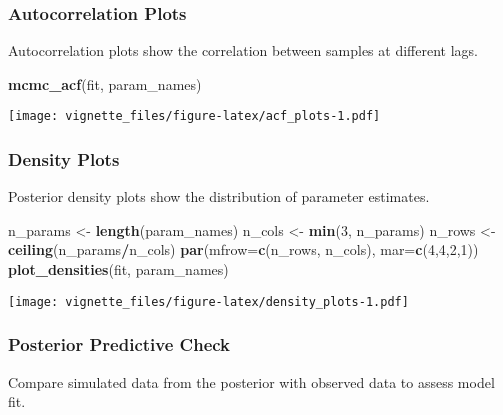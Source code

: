 \documentclass[
]{article}
\newenvironment{Shaded}{\begin{snugshade}}{\end{snugshade}}
\newcommand{\AttributeTok}[1]{\textcolor[rgb]{0.13,0.29,0.53}{#1}}
\newcommand{\DecValTok}[1]{\textcolor[rgb]{0.00,0.00,0.81}{#1}}
\newcommand{\FunctionTok}[1]{\textcolor[rgb]{0.13,0.29,0.53}{\textbf{#1}}}
\newcommand{\NormalTok}[1]{#1}
\newcommand{\OtherTok}[1]{\textcolor[rgb]{0.56,0.35,0.01}{#1}}
\newcommand{\SpecialCharTok}[1]{\textcolor[rgb]{0.81,0.36,0.00}{\textbf{#1}}}
\begin{document}
\subsubsection{Autocorrelation Plots}\label{autocorrelation-plots}

Autocorrelation plots show the correlation between samples at different
lags.

\begin{Shaded}
\begin{Highlighting}[]
\FunctionTok{mcmc\_acf}\NormalTok{(fit, param\_names)}
\end{Highlighting}
\end{Shaded}

\texttt{[image: vignette\_files/figure-latex/acf\_plots-1.pdf]}

\subsubsection{Density Plots}\label{density-plots}

Posterior density plots show the distribution of parameter estimates.

\begin{Shaded}
\begin{Highlighting}[]
\NormalTok{n\_params }\OtherTok{\textless{}{-}} \FunctionTok{length}\NormalTok{(param\_names)}
\NormalTok{n\_cols }\OtherTok{\textless{}{-}} \FunctionTok{min}\NormalTok{(}\DecValTok{3}\NormalTok{, n\_params)}
\NormalTok{n\_rows }\OtherTok{\textless{}{-}} \FunctionTok{ceiling}\NormalTok{(n\_params}\SpecialCharTok{/}\NormalTok{n\_cols)}
\FunctionTok{par}\NormalTok{(}\AttributeTok{mfrow=}\FunctionTok{c}\NormalTok{(n\_rows, n\_cols), }\AttributeTok{mar=}\FunctionTok{c}\NormalTok{(}\DecValTok{4}\NormalTok{,}\DecValTok{4}\NormalTok{,}\DecValTok{2}\NormalTok{,}\DecValTok{1}\NormalTok{))}
\FunctionTok{plot\_densities}\NormalTok{(fit, param\_names)}
\end{Highlighting}
\end{Shaded}

\texttt{[image: vignette\_files/figure-latex/density\_plots-1.pdf]}

\subsubsection{Posterior Predictive
Check}\label{posterior-predictive-check}

Compare simulated data from the posterior with observed data to assess
model fit.
\end{document}
